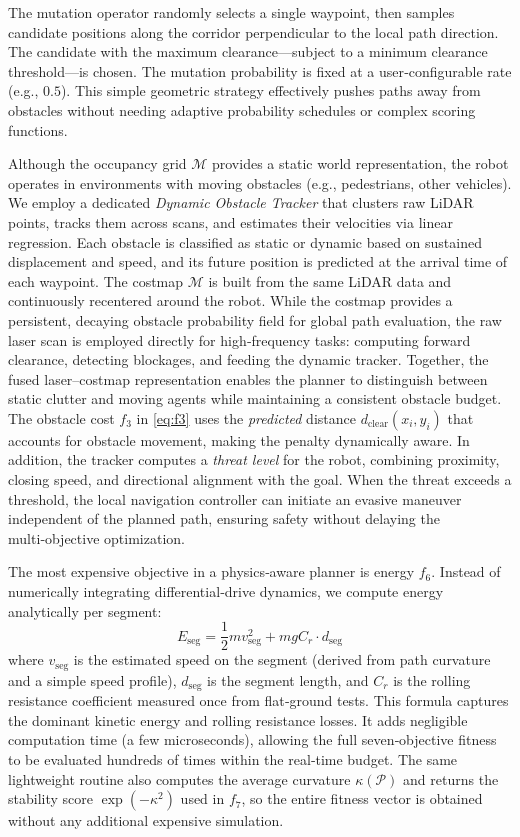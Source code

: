 \documentclass[lettersize,journal]{IEEEtran}
\begin{document}
The mutation operator randomly selects a single waypoint, then samples
candidate positions along the corridor perpendicular to the local path
direction. The candidate with the maximum clearance—subject to a minimum
clearance threshold—is chosen. The mutation probability is fixed at a
user‑configurable rate (e.g., $0.5$). This simple geometric strategy
effectively pushes paths away from obstacles without needing adaptive
probability schedules or complex scoring functions.

Although the occupancy grid $\mathcal{M}$ provides a static world
representation, the robot operates in environments with moving obstacles
(e.g., pedestrians, other vehicles). We employ a dedicated \emph{Dynamic
Obstacle Tracker} that clusters raw LiDAR points, tracks them across scans,
and estimates their velocities via linear regression. Each obstacle is
classified as static or dynamic based on sustained displacement and speed, and
its future position is predicted at the arrival time of each waypoint. The
costmap $\mathcal{M}$ is built from the same LiDAR data and continuously
recentered around the robot. While the costmap provides a persistent, decaying
obstacle probability field for global path evaluation, the raw laser scan is
employed directly for high‑frequency tasks: computing forward clearance,
detecting blockages, and feeding the dynamic tracker. Together, the fused
laser–costmap representation enables the planner to distinguish between static
clutter and moving agents while maintaining a consistent obstacle budget. The
obstacle cost $f_3$ in \eqref{eq:f3} uses the \emph{predicted} distance
$d_{\mathrm{clear}}(x_i,y_i)$ that accounts for obstacle movement, making the
penalty dynamically aware. In addition, the tracker computes a \emph{threat
level} for the robot, combining proximity, closing speed, and directional
alignment with the goal. When the threat exceeds a threshold, the local
navigation controller can initiate an evasive maneuver independent of the
planned path, ensuring safety without delaying the multi‑objective optimization.

The most expensive objective in a physics‑aware planner is energy $f_6$.
Instead of numerically integrating differential‑drive dynamics, we compute
energy analytically per segment:
\begin{equation}
  E_{\mathrm{seg}} = \frac12 m v_{\mathrm{seg}}^2 + m g C_r \cdot d_{\mathrm{seg}}
  \label{eq:energy_model}
\end{equation}
where $v_{\mathrm{seg}}$ is the estimated speed on the segment (derived from
path curvature and a simple speed profile), $d_{\mathrm{seg}}$ is the segment
length, and $C_r$ is the rolling resistance coefficient measured once from
flat‑ground tests. This formula captures the dominant kinetic energy and
rolling resistance losses. It adds negligible computation time (a few
microseconds), allowing the full seven‑objective fitness to be evaluated
hundreds of times within the real‑time budget. The same lightweight routine
also computes the average curvature $\kappa(\mathcal{P})$ and returns the
stability score $\exp(-\kappa^2)$ used in $f_7$, so the entire fitness vector
is obtained without any additional expensive simulation.
\end{document}
